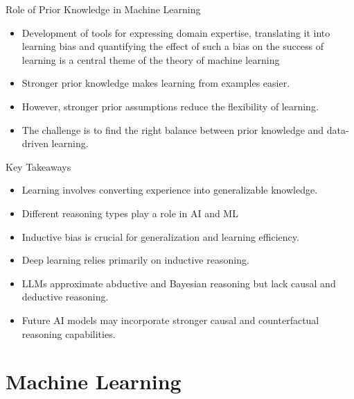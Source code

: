 \documentclass{beamer}
\begin{document}
\begin{frame}{Role of Prior Knowledge in Machine Learning}
    \begin{itemize}
        \item Development of tools for expressing domain expertise, translating it into learning bias and quantifying the effect of such a bias on the success of learning is a central theme of the theory of machine learning
        \item Stronger prior knowledge makes learning from examples easier.
        \item However, stronger prior assumptions reduce the flexibility of learning.
        \item The challenge is to find the right balance between prior knowledge and data-driven learning. 
    \end{itemize}
\end{frame}

\begin{frame}{Key Takeaways}
    \begin{itemize}
        \item Learning involves converting experience into generalizable knowledge.
        \item Different reasoning types play a role in AI and ML
        \item Inductive bias is crucial for generalization and learning efficiency.
        \item Deep learning relies primarily on inductive reasoning.
        \item LLMs approximate abductive and Bayesian reasoning but lack causal and deductive reasoning.
        \item Future AI models may incorporate stronger causal and counterfactual reasoning capabilities.
    \end{itemize}
\end{frame}


\section{Machine Learning}
\end{document}
